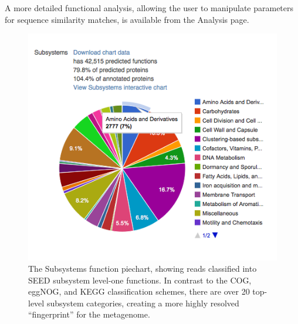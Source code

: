 \documentclass[12pt,fullpage]{report}
\begin{document}
A more detailed functional analysis, allowing the user to manipulate parameters for sequence similarity matches, is available from the Analysis page.

\begin{figure}
\begin{center}
\includegraphics[width=6in]{Images/subsystems-functions-piechart.png}
\end{center}
\caption{
The \gls{Subsystem}s function piechart, showing reads classified into SEED subsystem level-one functions. In contrast to the COG, eggNOG, and KEGG classification schemes, there are over 20 top-level subsystem categories, creating a more highly resolved ``fingerprint'' for the metagenome.
}
\label{fig:subsystems-functions-piechart}
\end{figure}




\end{document}
